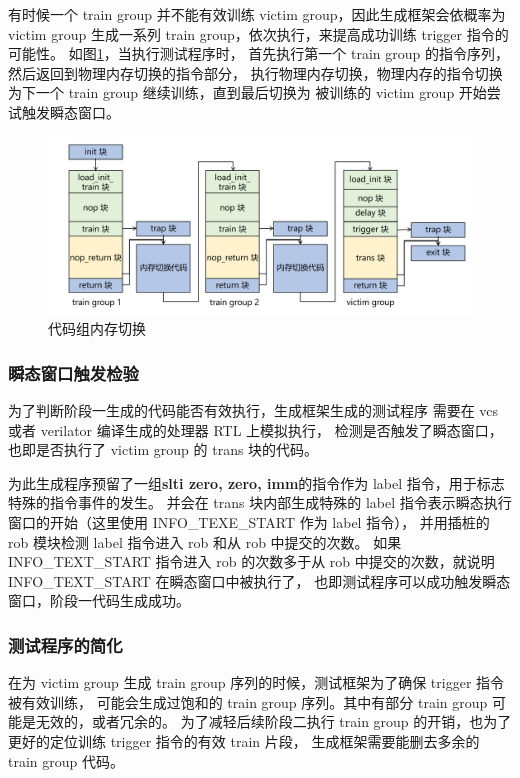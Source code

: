有时候一个 train group 并不能有效训练 victim group，因此生成框架会依概率为 victim group
生成一系列 train group，依次执行，来提高成功训练 trigger 指令的可能性。
如图\ref{paper:memory-switch}，当执行测试程序时，
首先执行第一个 train group 的指令序列，然后返回到物理内存切换的指令部分，
执行物理内存切换，物理内存的指令切换为下一个 train group 继续训练，直到最后切换为
被训练的 victim group 开始尝试触发瞬态窗口。\par

\begin{figure}[!h]
    \centering
    \includegraphics[width=\linewidth]{figure/paper/group-switch.png}
    \caption{代码组内存切换}
    \label{paper:memory-switch}
\end{figure}

\subsubsection{瞬态窗口触发检验}

为了判断阶段一生成的代码能否有效执行，生成框架生成的测试程序
需要在 vcs 或者 verilator 编译生成的处理器 RTL 上模拟执行，
检测是否触发了瞬态窗口，也即是否执行了 victim group 的 trans 块的代码。\par

为此生成程序预留了一组\textbf{slti zero, zero, imm}的指令作为 label 指令，用于标志特殊的指令事件的发生。
并会在 trans 块内部生成特殊的 label 指令表示瞬态执行窗口的开始（这里使用 INFO\_TEXE\_START 作为 label 指令），
并用插桩的 rob 模块检测 label 指令进入 rob 和从 rob 中提交的次数。
如果 INFO\_TEXT\_START 指令进入 rob 的次数多于从 rob 中提交的次数，就说明 INFO\_TEXT\_START 在瞬态窗口中被执行了，
也即测试程序可以成功触发瞬态窗口，阶段一代码生成成功。

\subsubsection{测试程序的简化}

在为 victim group 生成 train group 序列的时候，测试框架为了确保 trigger 指令被有效训练，
可能会生成过饱和的 train group 序列。其中有部分 train group 可能是无效的，或者冗余的。
为了减轻后续阶段二执行 train group 的开销，也为了更好的定位训练 trigger 指令的有效 train 片段，
生成框架需要能删去多余的 train group 代码。\par


